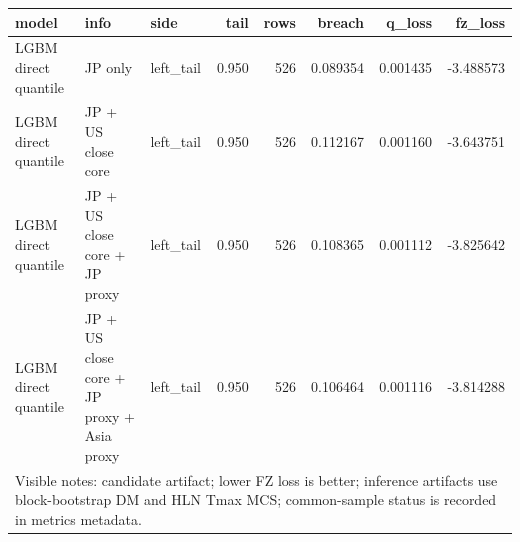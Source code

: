 \begin{tabular}{lllrrrrr}
\toprule
model & info & side & tail & rows & breach & q_loss & fz_loss \\
\midrule
LGBM direct quantile & JP only & left\_tail & 0.950 & 526 & 0.089354 & 0.001435 & -3.488573 \\
LGBM direct quantile & JP + US close core & left\_tail & 0.950 & 526 & 0.112167 & 0.001160 & -3.643751 \\
LGBM direct quantile & JP + US close core + JP proxy & left\_tail & 0.950 & 526 & 0.108365 & 0.001112 & -3.825642 \\
LGBM direct quantile & JP + US close core + JP proxy + Asia proxy & left\_tail & 0.950 & 526 & 0.106464 & 0.001116 & -3.814288 \\
\midrule
\multicolumn{8}{l}{\footnotesize Visible notes: candidate artifact; lower FZ loss is better; inference artifacts use block-bootstrap DM and HLN Tmax MCS; common-sample status is recorded in metrics metadata.} \\
\bottomrule
\end{tabular}
